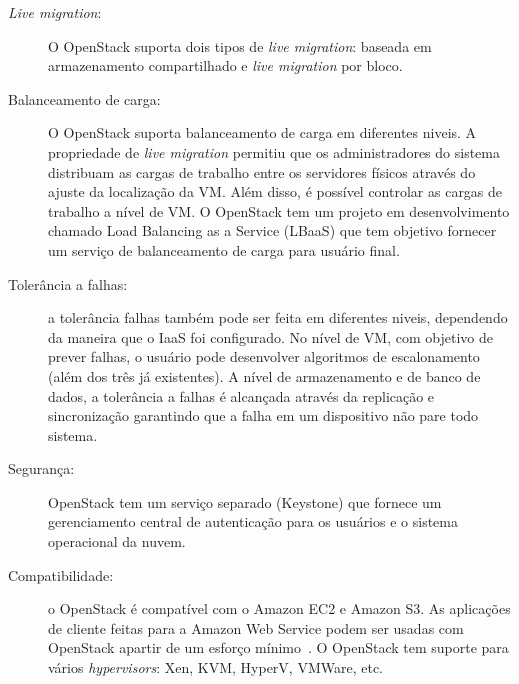 \begin{description}

	\item[\textit{Live migration}:] O OpenStack suporta dois tipos de \textit{live migration}: baseada em armazenamento compartilhado e \textit{live migration} por bloco.

	\item[Balanceamento de carga:] O OpenStack suporta balanceamento de carga em diferentes niveis. A propriedade de \textit{live migration} permitiu que os administradores do sistema distribuam as cargas de trabalho entre os servidores físicos através do ajuste da localização da VM. Além disso, é possível controlar as cargas de trabalho a nível de VM. O OpenStack tem um projeto em desenvolvimento chamado Load Balancing as a Service (LBaaS) que tem objetivo fornecer um serviço de balanceamento de carga para usuário final.

	\item[Tolerância a falhas:] a tolerância  falhas também pode ser feita em diferentes niveis, dependendo da maneira que o IaaS foi configurado. No nível de VM, com objetivo de prever falhas, o usuário pode desenvolver algoritmos de escalonamento (além dos três já existentes). A nível de armazenamento e de banco de dados, a tolerância a falhas é alcançada através da replicação e sincronização garantindo que a falha em um dispositivo não pare todo sistema.

	\item[Segurança:] OpenStack tem um serviço separado (Keystone) que fornece um gerenciamento central de autenticação para os usuários e o sistema operacional da nuvem.

	\item[Compatibilidade:] o OpenStack é compatível com o Amazon EC2 e Amazon S3. As aplicações de cliente feitas para a Amazon Web Service podem ser usadas com OpenStack apartir de um esforço mínimo~\cite{OpenStack:Online}. O OpenStack tem suporte para vários \textit{hypervisors}: Xen, KVM, HyperV, VMWare, etc.

\end{description}




